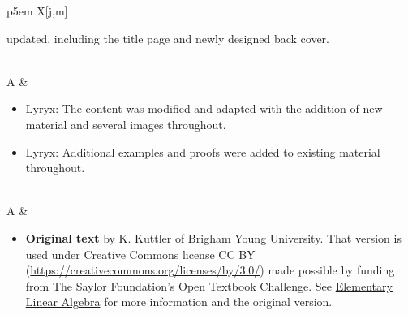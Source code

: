 {\begin{tabu}{p{5em} X[j,m]}
\begin{itemize}
      updated, including the title page and newly designed back
      cover.
    \end{itemize}
    \\  A &
    \begin{itemize}
    \item Lyryx: The content was modified and adapted with the
      addition of new material and several images throughout.
    \item Lyryx: Additional examples and proofs were added to existing
      material throughout.
    \end{itemize}
    \\  A &
    \begin{itemize}
    \item \textbf{Original text} by K. Kuttler of Brigham Young
      University. That version is used under Creative Commons license
      CC BY (\url{https://creativecommons.org/licenses/by/3.0/}) made
      possible by funding from The Saylor Foundation's Open Textbook
      Challenge. See
      \href{https://www.saylor.org/site/wp-content/uploads/2012/02/Elementary-Linear-Algebra-1-30-11-Kuttler-OTC.pdf}{Elementary Linear Algebra}
      for more information and the original version.
    \end{itemize}
    \\ \hline
  \end{tabu}
  \medskip
}

\setlength{\parskip}{\baselineskip}


